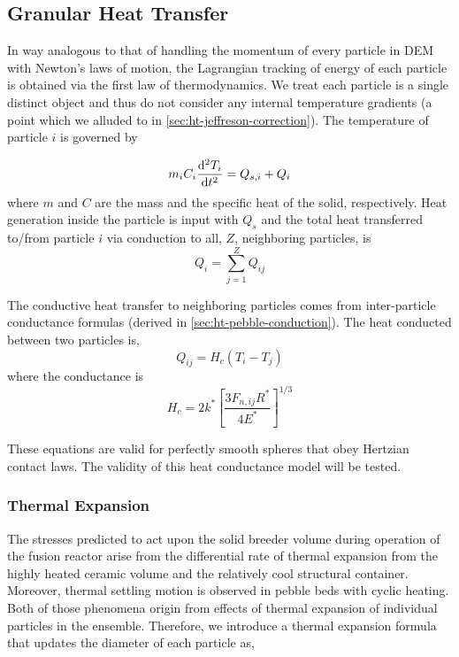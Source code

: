 \subsection{Granular Heat Transfer}\label{sec:dem-heat-transfer}

In way analogous to that of handling the momentum of every particle in DEM with Newton's laws of motion, the Lagrangian tracking of energy of each particle is obtained via the first law of thermodynamics. We treat each particle is a single distinct object and thus do not consider any internal temperature gradients (a point which we alluded to in \cref{sec:ht-jeffreson-correction}). The temperature of particle $i$ is governed by

\begin{equation}\label{eq:thermoFirstLaw}
	m_iC_i\frac{\mathrm{d}^2{T_i}}{\mathrm{d}t^2} = Q_{s,i} + Q_{i}
\end{equation}
where $m$ and $C$ are the mass and the specific heat of the solid, respectively. Heat generation inside the particle is input with $Q_{s}$ and the total heat transferred to/from particle $i$ via conduction to all, $Z$, neighboring particles, is
\begin{equation}
	Q_i = \sum_{j=1}^Z Q_{ij}
\end{equation}

The conductive heat transfer to neighboring particles comes from inter-particle conductance formulas (derived in \cref{sec:ht-pebble-conduction}). The heat conducted between two particles is,
\begin{equation}
	Q_{ij} = H_c(T_i - T_j)
\end{equation} 
where the conductance is
\begin{equation}\label{eq:dem-conductance}
	H_c= 2k^*\left[\frac{3F_{n,ij}R^*}{4E^*}\right]^{1/3}
\end{equation}

These equations are valid for perfectly smooth spheres that obey Hertzian contact laws. The validity of this heat conductance model will be tested.

\subsubsection{Thermal Expansion}
The stresses predicted to act upon the solid breeder volume during operation of the fusion reactor arise from the differential rate of thermal expansion from the highly heated ceramic volume and the relatively cool structural container. Moreover, thermal settling motion is observed in pebble beds with cyclic heating.\cite{Tanigawa:2010cr, Vargas2007, Chen2009, Divoux2008} Both of those phenomena origin from effects of thermal expansion of individual particles in the ensemble. Therefore, we introduce a thermal expansion formula that updates the diameter of each particle as,

